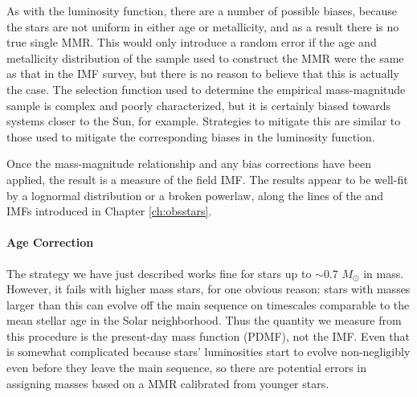 As with the luminosity function, there are a number of possible biases, because the stars are not uniform in either age or metallicity, and as a result there is no true single MMR. This would only introduce a random error if the age and metallicity distribution of the sample used to construct the MMR were the same as that in the IMF survey, but there is no reason to believe that this is actually the case. The selection function used to determine the empirical mass-magnitude sample is complex and poorly characterized, but it is certainly biased towards systems closer to the Sun, for example. Strategies to mitigate this are similar to those used to mitigate the corresponding biases in the luminosity function.

Once the mass-magnitude relationship and any bias corrections have been applied, the result is a measure of the field IMF. The results appear to be well-fit by a lognormal distribution or a broken powerlaw, along the lines of the \citet{chabrier05a} and \citet{kroupa02a} IMFs introduced in Chapter \ref{ch:obsstars}.

\paragraph{Age Correction}

The strategy we have just described works fine for stars up to $\sim 0.7$ $M_\odot$ in mass. However, it fails with higher mass stars, for one obvious reason: stars with masses larger than this can evolve off the main sequence on timescales comparable to the mean stellar age in the Solar neighborhood. Thus the quantity we measure from this procedure is the present-day mass function (PDMF), not the IMF. Even that is somewhat complicated because stars' luminosities start to evolve non-negligibly even before they leave the main sequence, so there are potential errors in assigning masses based on a MMR calibrated from younger stars.

